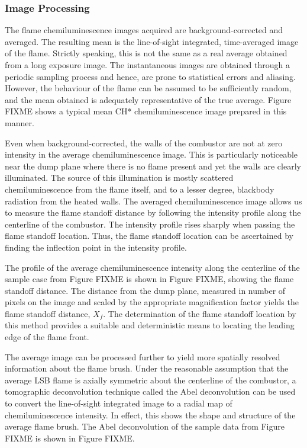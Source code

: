 \subsubsection{Image Processing}

The flame chemiluminescence images acquired are background-corrected and averaged.
The resulting mean is the line-of-sight integrated, time-averaged image of the flame.
Strictly speaking, this is not the same as a real average obtained from a long exposure image.
The instantaneous images are obtained through a periodic sampling process and hence, are prone to statistical errors and aliasing.
However, the behaviour of the flame can be assumed to be sufficiently random, and the mean obtained is adequately representative of the true average.
Figure FIXME shows a typical mean CH* chemiluminescence image prepared in this manner.

Even when background-corrected, the walls of the combustor are not at zero intensity in the average chemiluminescence image.
This is particularly noticeable near the dump plane where there is no flame present and yet the walls are clearly illuminated.
The source of this illumination is mostly scattered chemiluminescence from the flame itself, and to a lesser degree, blackbody radiation from the heated walls.
The averaged chemiluminescence image allows us to measure the flame standoff distance by following the intensity profile along the centerline of the combustor.
The intensity profile rises sharply when passing the flame standoff location.
Thus, the flame standoff location can be ascertained by finding the inflection point in the intensity profile.

The profile of the average chemiluminescence intensity along the centerline of the sample case from Figure FIXME is shown in Figure FIXME, showing the flame standoff distance.
The distance from the dump plane, measured in number of pixels on the image and scaled by the appropriate magnification factor yields the flame standoff distance, \(X_f\).
The determination of the flame standoff location by this method provides a suitable and deterministic means to locating the leading edge of the flame front.

The average image can be processed further to yield more spatially resolved information about the flame brush.
Under the reasonable assumption that the average LSB flame is axially symmetric about the centerline of the combustor, a tomographic deconvolution technique called the Abel deconvolution\cite{1992-dasch} can be used to convert the line-of-sight integrated image to a radial map of chemiluminescence intensity.
In effect, this shows the shape and structure of the average flame brush.
The Abel deconvolution of the sample data from Figure FIXME is shown in Figure FIXME.


